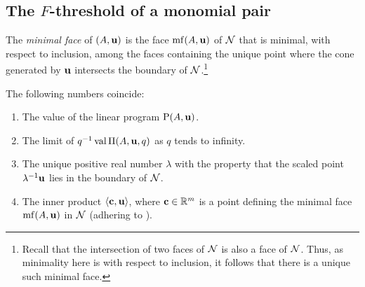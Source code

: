 \documentclass[11pt]{amsart}
\begin{document}



\subsection{The $F$-threshold of a monomial pair}

\begin{definition}
   The \emph{minimal face} of $(A, \mathbf{u})$ is the face $\operatorname{mf}(A, \mathbf{u})$ of $\mathcal{N}$ that is minimal, with respect to inclusion, among the faces containing the unique point where the cone generated by $\mathbf{u}$ intersects the boundary of $\mathcal{N}$.\footnote{Recall that the intersection of two faces of $\mathcal{N}$ is also a face of $\mathcal{N}$. Thus, as minimality here is with respect to inclusion, it follows that there is a unique such minimal face.}
\end{definition}


\begin{proposition}
   \label{FT descriptions: P}
   The following numbers coincide\textup:
   \begin{enumerate}
      \item\label{value} The value of the linear program $\mathrm{P}(A, \mathbf{u})$.
      \item\label{limit} The limit of $q^{-1}\operatorname{val} \Pi(A,\mathbf{u},q)$ as $q$ tends to infinity.
      \item\label{lambda} The unique positive real number $\lambda$ with the property that the scaled point $\lambda^{-1}\mathbf{u}$ lies in the boundary of $\mathcal{N}$.
      \item\label{new ip} The inner product $\langle \mathbf{c}, \mathbf{u} \rangle$, where $\mathbf{c} \in \mathbb{R}^m$ is a point defining the minimal face $\operatorname{mf}(A, \mathbf{u})$ in $\mathcal{N}$ \textup(adhering to \textup).
   \end{enumerate}
\end{proposition}
\end{document}
